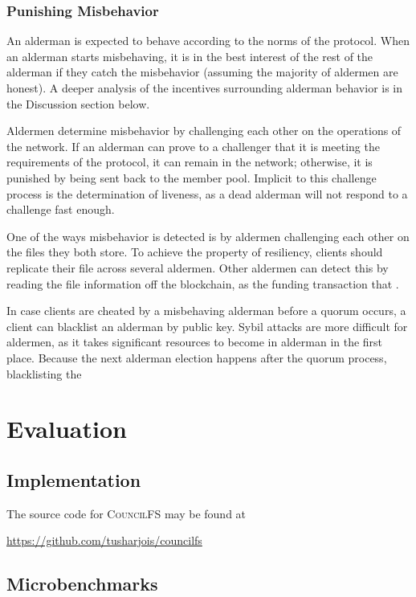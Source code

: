 \documentclass{article}
\begin{document}
\subsubsection{Punishing Misbehavior}

An alderman is expected to behave according to the norms of the protocol. When
an alderman starts misbehaving, it is in the best interest of the rest of the
alderman if they catch the misbehavior (assuming the majority of aldermen are
honest). A deeper analysis of the incentives surrounding alderman behavior is in
the Discussion section below.

Aldermen determine misbehavior by challenging each other on the operations of
the network. If an alderman can prove to a challenger that it is meeting the
requirements of the protocol, it can remain in the network; otherwise, it is
punished by being sent back to the member pool. Implicit to this challenge
process is the determination of liveness, as a dead alderman will not respond to
a challenge fast enough.

One of the ways misbehavior is detected is by aldermen challenging each other on
the files they both store. To achieve the property of resiliency, clients should
replicate their file across several aldermen. Other aldermen can detect this by
reading the file information off the blockchain, as the funding transaction that
.

In case clients are cheated by a misbehaving alderman before a quorum occurs, a
client can blacklist an alderman by public key. Sybil attacks are more difficult
for aldermen, as it takes significant resources to become in alderman in the
first place. Because the next alderman election happens after the quorum
process, blacklisting the 

\section{Evaluation}

\subsection{Implementation}

The source code for \textsc{CouncilFS} may be found at
\begin{center}
  \url{https://github.com/tusharjois/councilfs}
\end{center}

\subsection{Microbenchmarks}
\end{document}
